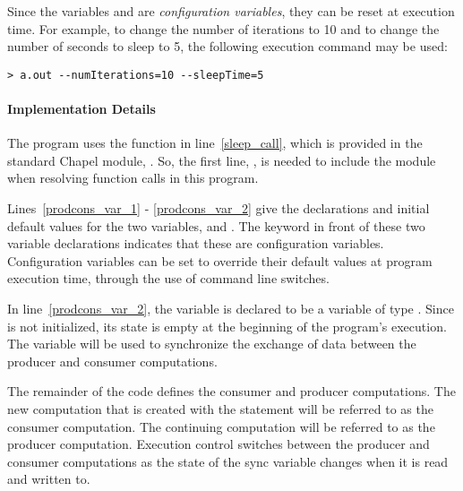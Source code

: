 Since the variables  and  are 
{\em configuration variables},  they can 
be reset at execution time.
For example, to change the number of iterations to 10
and to change the number of seconds to sleep to 5, the following execution command
may be used:
{\small
\begin{verbatim}
> a.out --numIterations=10 --sleepTime=5
\end{verbatim}}

\paragraph{Implementation Details}
The program uses the  function in line~\ref{sleep_call}, which is 
provided in the
standard Chapel module, .  So, the first line, , 
is needed to include the  module when resolving 
function calls in this program.  

Lines~\ref{prodcons_var_1} - \ref{prodcons_var_2} give the declarations 
and initial default values
for the two variables,  and .
The  keyword in front of these two variable declarations 
indicates that these are configuration variables.  Configuration variables 
can be set to override their default values at program execution time, through the 
use of command line switches.  

In line~\ref{prodcons_var_2}, the variable  is 
declared to be a  variable 
of type .  Since 
is not initialized, its state is empty at the beginning of the program's execution.
The variable  will be used
to synchronize the exchange of data between the producer and consumer computations.

The remainder of the code defines the consumer and producer computations.
The new computation that is created with the  statement will
be referred to as the consumer computation.  The continuing computation
will be referred to as the
producer computation.  Execution control switches between the
producer and consumer computations as the state of the sync variable 
changes when it is read and written to.

